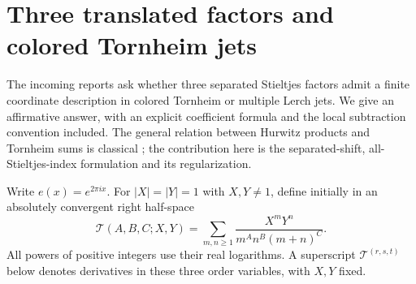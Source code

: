 \section{Three translated factors and colored Tornheim jets}
\label{sec:triple}

The incoming reports ask whether three separated Stieltjes factors admit a
finite coordinate description in colored Tornheim or multiple Lerch jets.
We give an affirmative answer, with an explicit coefficient formula and
the local subtraction convention included.  The general relation between
Hurwitz products and Tornheim sums is classical
\cite{espinosa-tornheim,zhao-colored,zhao-zhou}; the contribution here is
the separated-shift, all-Stieltjes-index formulation and its regularization.

Write $e(x)=e^{2\pi i x}$.  For $|X|=|Y|=1$ with $X,Y\ne1$, define initially
in an absolutely convergent right half-space
\begin{equation}\label{eq:Tdef}
 \mathcal T(A,B,C;X,Y)
 =\sum_{m,n\ge1}\frac{X^mY^n}{m^A n^B(m+n)^C}.
\end{equation}
All powers of positive integers use their real logarithms.  A superscript
$\mathcal T^{(r,s,t)}$ below denotes derivatives in these three order
variables, with $X,Y$ fixed.

